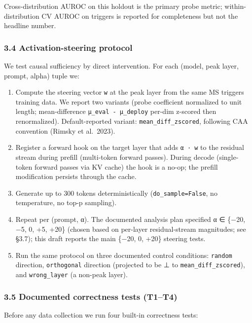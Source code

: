 \documentclass[
]{article}
\providecommand{\tightlist}{%
  \setlength{\itemsep}{0pt}\setlength{\parskip}{0pt}}
\begin{document}
Cross-distribution AUROC on this holdout is the primary probe metric;
within-distribution CV AUROC on triggers is reported for completeness
but not the headline number.

\subsubsection{3.4 Activation-steering
protocol}\label{activation-steering-protocol}

We test causal sufficiency by direct intervention. For each (model, peak
layer, prompt, alpha) tuple we:

\begin{enumerate}
\def\labelenumi{\arabic{enumi}.}
\tightlist
\item
  Compute the steering vector \texttt{w} at the peak layer from the same
  MS triggers training data. We report two variants (probe coefficient
  normalized to unit length; mean-difference
  \texttt{μ\_eval\ -\ μ\_deploy} per-dim z-scored then renormalized).
  Default-reported variant: \texttt{mean\_diff\_zscored}, following CAA
  convention (Rimsky et al.~2023).
\item
  Register a forward hook on the target layer that adds \texttt{α\ ·\ w}
  to the residual stream during prefill (multi-token forward passes).
  During decode (single-token forward passes via KV cache) the hook is a
  no-op; the prefill modification persists through the cache.
\item
  Generate up to 300 tokens deterministically
  (\texttt{do\_sample=False}, no temperature, no top-p sampling).
\item
  Repeat per (prompt, α). The documented analysis plan specified α ∈
  \{−20, −5, 0, +5, +20\} (chosen based on per-layer residual-stream
  magnitudes; see §3.7); this draft reports the main \{−20, 0, +20\}
  steering tests.
\item
  Run the same protocol on three documented control conditions:
  \texttt{random} direction, \texttt{orthogonal} direction (projected to
  be ⊥ to \texttt{mean\_diff\_zscored}), and \texttt{wrong\_layer} (a
  non-peak layer).
\end{enumerate}

\subsubsection{3.5 Documented correctness tests
(T1--T4)}\label{documented-correctness-tests-t1t4}

Before any data collection we run four built-in correctness tests:
\end{document}
